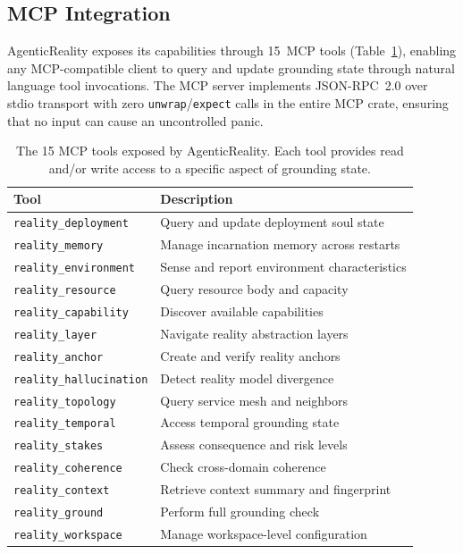 \documentclass[10pt, twocolumn]{article}
\begin{document}
\subsection{MCP Integration}
\label{sec:mcp}

AgenticReality exposes its capabilities through 15~MCP tools (Table~\ref{tab:mcp_tools}), enabling any MCP-compatible client to query and update grounding state through natural language tool invocations. The MCP server implements JSON-RPC~2.0 over stdio transport with zero \texttt{unwrap}/\texttt{expect} calls in the entire MCP crate, ensuring that no input can cause an uncontrolled panic.

\begin{table}[t]
\caption{The 15 MCP tools exposed by AgenticReality. Each tool provides read and/or write access to a specific aspect of grounding state.}
\label{tab:mcp_tools}
\centering
\scriptsize
\begin{tabular}{@{}lp{4.2cm}@{}}
\toprule
\textbf{Tool} & \textbf{Description} \\
\midrule
\texttt{reality\_deployment} & Query and update deployment soul state \\
\texttt{reality\_memory} & Manage incarnation memory across restarts \\
\texttt{reality\_environment} & Sense and report environment characteristics \\
\texttt{reality\_resource} & Query resource body and capacity \\
\texttt{reality\_capability} & Discover available capabilities \\
\texttt{reality\_layer} & Navigate reality abstraction layers \\
\texttt{reality\_anchor} & Create and verify reality anchors \\
\texttt{reality\_hallucination} & Detect reality model divergence \\
\texttt{reality\_topology} & Query service mesh and neighbors \\
\texttt{reality\_temporal} & Access temporal grounding state \\
\texttt{reality\_stakes} & Assess consequence and risk levels \\
\texttt{reality\_coherence} & Check cross-domain coherence \\
\texttt{reality\_context} & Retrieve context summary and fingerprint \\
\texttt{reality\_ground} & Perform full grounding check \\
\texttt{reality\_workspace} & Manage workspace-level configuration \\
\bottomrule
\end{tabular}
\end{table}
\end{document}
